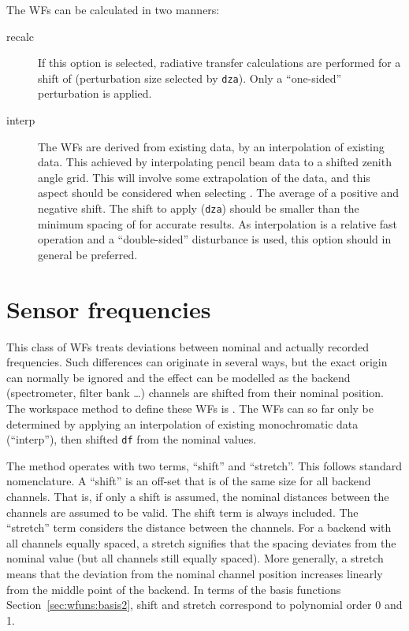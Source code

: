 The WFs can be calculated in two manners:
\begin{description}
\item[recalc] If this option is selected, radiative transfer calculations are
  performed for a shift of  (perturbation size selected
  by \verb|dza|). Only a ``one-sided'' perturbation is applied.
\item[interp] The WFs are derived from existing data, by an interpolation of
  existing data. This achieved by interpolating pencil beam data to a shifted
  zenith angle grid. This will involve some extrapolation of the data, and this
  aspect should be considered when selecting . The
  average of a positive and negative shift. The shift to apply (\verb|dza|)
  should be smaller than the minimum spacing of 
  for accurate results. As interpolation is a relative fast operation and a
  ``double-sided'' disturbance is used, this option should in general be
  preferred.
\end{description}




\section{Sensor frequencies}
\label{sec:wfuns:sensorfreq}

This class of WFs treats deviations between nominal and actually recorded
frequencies. Such differences can originate in several ways, but the exact
origin can normally be ignored and the effect can be modelled as the backend
(spectrometer, filter bank \dots) channels are shifted from their nominal
position. The workspace method to define these WFs is
. The WFs can so far only be
determined by applying an interpolation of existing monochromatic data
(``interp''), then shifted \verb|df| from the nominal values.

The method operates with two terms, ``shift'' and ``stretch''. This follows
standard nomenclature. A ``shift'' is an off-set that is of the same size for
all backend channels. That is, if only a shift is assumed, the nominal
distances between the channels are assumed to be valid. The shift term is
always included. The ``stretch'' term considers the distance between the
channels. For a backend with all channels equally spaced, a stretch signifies
that the spacing deviates from the nominal value (but all channels still
equally spaced). More generally, a stretch means that the deviation from the
nominal channel position increases linearly from the middle point of the
backend. In terms of the basis functions Section~\ref{sec:wfuns:basis2}, shift
and stretch correspond to polynomial order 0 and 1.




